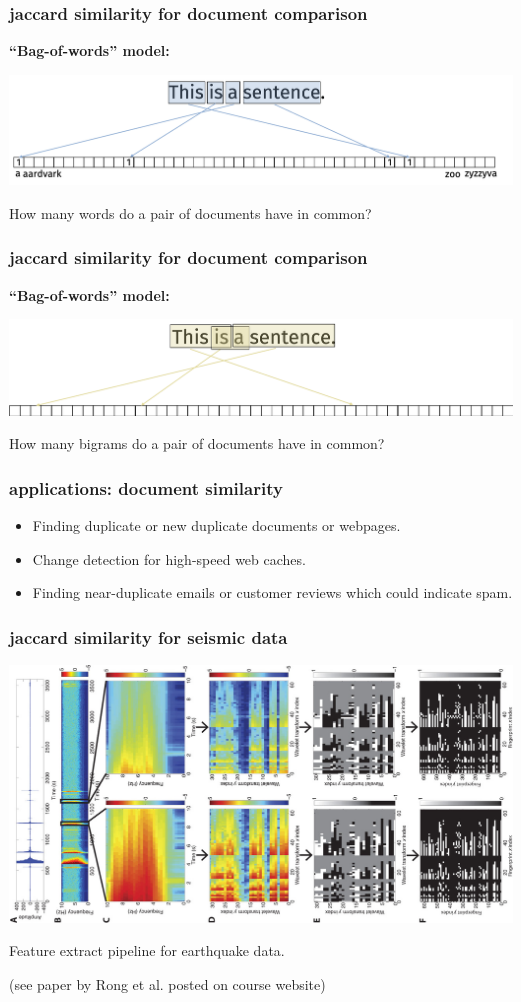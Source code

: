 \documentclass[compress]{beamer}
\begin{document}
\begin{frame}
	\frametitle{jaccard similarity for document comparison}
	\textbf{``Bag-of-words'' model:}
	\begin{center}
			\includegraphics[width=.95\textwidth]{bagofwords.png}
		\end{center}
	
	How many words do a pair of documents have in common?
\end{frame}

\begin{frame}
	\frametitle{jaccard similarity for document comparison}
	\textbf{``Bag-of-words'' model:}
	\begin{center}
			\includegraphics[width=.95\textwidth]{bigrams.png}
		\end{center}
	
	How many bigrams do a pair of documents have in common?
\end{frame}

\begin{frame}
	\frametitle{applications: document similarity}
	\begin{itemize}
			\item Finding duplicate or new duplicate documents or webpages.
			\item Change detection for high-speed web caches.
			\item Finding near-duplicate emails or customer reviews which could indicate spam.
		\end{itemize}
\end{frame}

\begin{frame}
	\frametitle{jaccard similarity for seismic data}
	\begin{center}
			\vspace{-.5em}
			\includegraphics[width=.6\textwidth]{earthquakeFeatures.jpg}
			
			\vspace{-.5em}
			Feature extract pipeline for earthquake data.
			
			(see paper by Rong et al. posted on course website)
		\end{center}
\end{frame}
\end{document}
